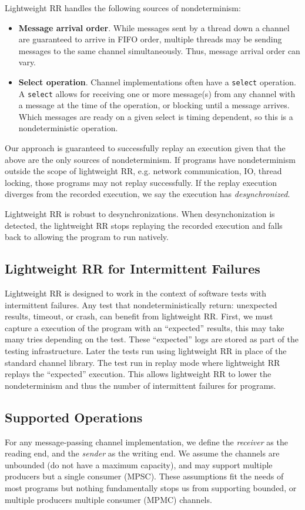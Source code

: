 \documentclass{article}
\begin{document}
Lightweight RR handles the following sources of nondeterminism:
\begin{itemize}
\item \textbf{Message arrival order}. While messages sent by a thread down a channel are guaranteed to arrive in FIFO order, multiple threads may be sending messages to the same channel simultaneously. Thus, message arrival order can vary.
\item \textbf{Select operation}. Channel implementations often have a \texttt{select} operation. A \texttt{select} allows for receiving one or more message(s) from any channel with a message at the time of the operation, or blocking until a message arrives. Which messages are ready on a given select is timing dependent, so this is a nondeterministic operation.
\end{itemize}

Our approach is guaranteed to successfully replay an execution given that the above are the only sources of nondeterminism. If programs have nondeterminism outside the scope of lightweight RR, e.g. network communication, IO, thread locking, those programs may not replay successfully. If the replay execution diverges from the recorded execution, we say the execution has \textit{desynchronized}.

Lightweight RR is robust to desynchronizations. When desynchonization is detected, the lightweight RR stops replaying the recorded execution and falls back to allowing the program to run natively.

\subsection{Lightweight RR for Intermittent Failures}
Lightweight RR is designed to work in the context of software tests with intermittent
failures.
Any test that nondeterministically return: unexpected results, timeout, or crash, can
benefit from lightweight RR. First, we must capture a execution of the program with an
``expected'' results, this may take many tries depending on the test.
These ``expected'' logs are stored as part of the testing infrastructure. Later the
tests run using lightweight RR in place of the standard channel library. The test run
in replay mode where lightweight RR replays the ``expected'' execution. This allows
lightweight RR to lower the nondeterminism and thus the number of intermittent failures
for programs.

\subsection{Supported Operations}
For any message-passing channel implementation, we define the \textit{receiver} as the reading end, and the \textit{sender} as the writing end. We assume the channels are unbounded (do not have a maximum capacity), and may support multiple producers but a single consumer (MPSC). These assumptions fit the needs of most programs but nothing fundamentally stops us from supporting bounded, or multiple producers multiple consumer (MPMC) channels.
\end{document}
